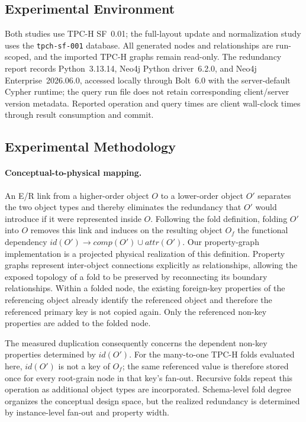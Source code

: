 \documentclass[sigconf]{acmart}
\begin{document}
\subsection{Experimental Environment}
\label{subsec:fd_experimental_environment}

Both studies use TPC-H SF~0.01; the full-layout update and normalization study
uses the \texttt{tpch-sf-001} database. All generated
nodes and relationships are run-scoped, and the imported TPC-H graphs remain
read-only.
The redundancy report records Python~3.13.14, Neo4j Python driver~6.2.0, and
Neo4j Enterprise~2026.06.0, accessed locally through Bolt~6.0 with the
server-default Cypher runtime; the query run file does not retain corresponding
client/server version metadata. Reported operation and query times are client
wall-clock times through result consumption and commit.

\subsection{Experimental Methodology}
\label{subsec:fd_redundancy_method}

\paragraph{Conceptual-to-physical mapping.}
An E/R link from a higher-order object $O$ to a lower-order object $O'$
separates the two object types and thereby eliminates the redundancy that
$O'$ would introduce if it were represented inside $O$. Following the fold
definition, folding $O'$ into $O$ removes this link and induces on the
resulting object $O_f$ the functional dependency
$\textit{id}(O')\rightarrow
\textit{comp}(O')\cup\textit{attr}(O')$.
Our property-graph implementation is a projected physical realization of this
definition. Property graphs represent inter-object connections explicitly as
relationships, allowing the exposed topology of a fold to be preserved by
reconnecting its boundary relationships. Within a folded node, the existing
foreign-key properties of the referencing object already identify the
referenced object and therefore the referenced primary key is not copied
again. Only the referenced non-key properties are added to the folded node.

The measured duplication consequently concerns the dependent non-key
properties determined by $\textit{id}(O')$. For the many-to-one TPC-H folds
evaluated here, $\textit{id}(O')$ is not a key of $O_f$; the same referenced
value is therefore stored once for every root-grain node in that key's
fan-out. Recursive folds repeat this operation as additional object types are
incorporated. Schema-level fold degree organizes the conceptual design space,
but the realized redundancy is determined by instance-level fan-out and
property width.
\end{document}

